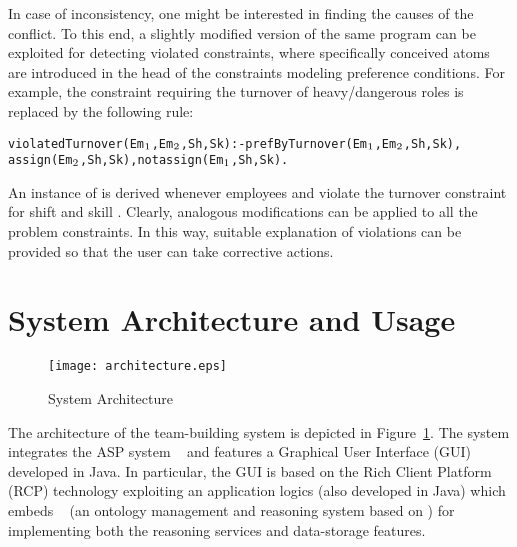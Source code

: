 \documentclass{tlp}
\begin{document}
In case of inconsistency, one might be interested in finding the causes of the conflict.
To this end, a slightly modified version of the same program can be exploited for detecting violated constraints,
where specifically conceived atoms are introduced in the head of the constraints modeling preference conditions.
For example, the constraint requiring the turnover of heavy/dangerous roles is replaced by the
following rule:
\begin{alltt}\small
 violatedTurnover(Em\(\sb{1}\),Em\(\sb{2}\),Sh,Sk) :- prefByTurnover(Em\(\sb{1}\),Em\(\sb{2}\),Sh,Sk),
    assign(Em\(\sb{2}\),Sh,Sk), not assign(Em\(\sb{1}\),Sh,Sk).
\end{alltt}\normalsize
An instance of  is derived
whenever employees  and  violate the turnover constraint for shift  and skill .
Clearly, analogous modifications can be applied to all the problem constraints.
In this way, suitable explanation of violations can be provided so that
the user can take corrective actions.


\section{System Architecture and Usage}\label{sec:system}

\begin{figure}[t!]
\centering
\texttt{[image: architecture.eps]}
\caption{ System Architecture}\label{fig:arch}
\end{figure}


The architecture of the team-building system is depicted in Figure~\ref{fig:arch}.
The system integrates the ASP system \dlv~\cite{leon-etal-2002-dlv} and features
a Graphical User Interface (GUI) developed in Java.
In particular, the GUI is based on the Rich Client Platform (RCP) technology
exploiting an application logics (also developed in Java)
which embeds \ontodlv~\cite{ricc-etal-2008-jlc}
(an ontology management and reasoning system based on \dlv)
for implementing both the reasoning services and data-storage features.
\end{document}

